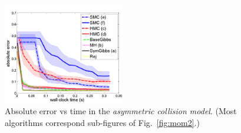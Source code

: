 \documentclass[]{article}
\begin{document}



\begin{figure}
\centering
     \includegraphics[width=0.8\linewidth, height=125pt]
{plotsx/vis-col/err-vs-time__param2-shaded.pdf}
      \caption{
Absolute error vs time in the \emph{asymmetric collision model}. (Most algorithms correspond sub-figures of Fig.~\ref{fig:mom2}.)
 }
\label{fig:asymmetric}
\end{figure}
\end{document}
